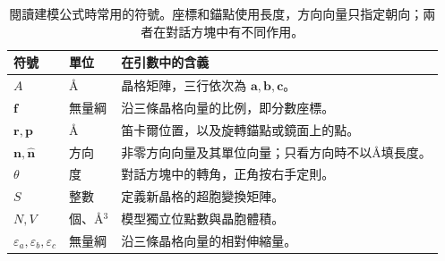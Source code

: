 \begin{table}[!htb]
\centering\small
\begin{tabularx}{\linewidth}{llX}
\toprule
符號 & 單位 & 在引數中的含義\\
\midrule
$A$ & \AA & 晶格矩陣，三行依次為 $\mathbf a,\mathbf b,\mathbf c$。\\
$\mathbf f$ & 無量綱 & 沿三條晶格向量的比例，即分數座標。\\
$\mathbf r,\mathbf p$ & \AA & 笛卡爾位置，以及旋轉錨點或鏡面上的點。\\
$\mathbf n,\hat{\mathbf n}$ & 方向 & 非零方向向量及其單位向量；只看方向時不以\AA 填長度。\\
$\theta$ & 度 & 對話方塊中的轉角，正角按右手定則。\\
$S$ & 整數 & 定義新晶格的超胞變換矩陣。\\
$N,V$ & 個、\AA$^3$ & 模型獨立位點數與晶胞體積。\\
$\varepsilon_a,\varepsilon_b,\varepsilon_c$ & 無量綱 & 沿三條晶格向量的相對伸縮量。\\
\bottomrule
\end{tabularx}
\caption{閱讀建模公式時常用的符號。座標和錨點使用長度，方向向量只指定朝向；兩者在對話方塊中有不同作用。}
\label{tab:round10-modeling-symbols}
\end{table}
